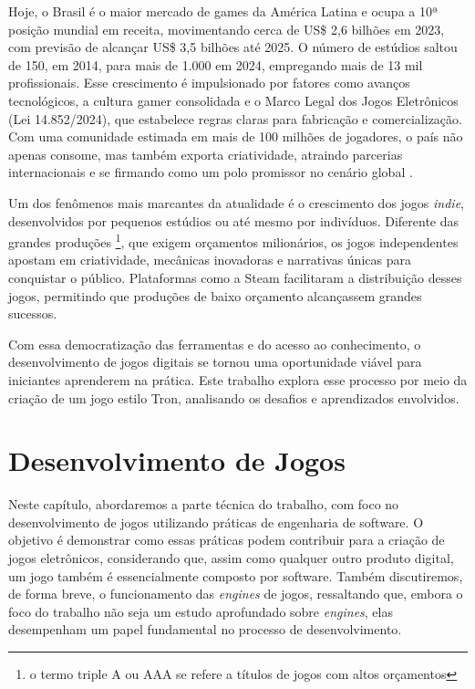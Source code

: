 Hoje, o Brasil é o maior mercado de games da América Latina e ocupa a 10ª posição mundial em receita, movimentando cerca de US\$ 2,6 bilhões em 2023, com previsão de alcançar US\$ 3,5 bilhões até 2025. O número de estúdios saltou de 150, em 2014, para mais de 1.000 em 2024, empregando mais de 13 mil profissionais. Esse crescimento é impulsionado por fatores como avanços tecnológicos, a cultura gamer consolidada e o Marco Legal dos Jogos Eletrônicos (Lei 14.852/2024), que estabelece regras claras para fabricação e comercialização. Com uma comunidade estimada em mais de 100 milhões de jogadores, o país não apenas consome, mas também exporta criatividade, atraindo parcerias internacionais e se firmando como um polo promissor no cenário global \cite{avell2025}.

Um dos fenômenos mais marcantes da atualidade é o crescimento dos jogos \textit{indie}, desenvolvidos por pequenos estúdios ou até mesmo por indivíduos. Diferente das grandes produções  \footnote{o termo triple A ou AAA se refere a títulos de jogos com altos orçamentos}, que exigem orçamentos milionários, os jogos independentes apostam em criatividade, mecânicas inovadoras e narrativas únicas para conquistar o público. Plataformas como a Steam facilitaram a distribuição desses jogos, permitindo que produções de baixo orçamento alcançassem grandes sucessos.

Com essa democratização das ferramentas e do acesso ao conhecimento, o desenvolvimento de jogos digitais se tornou uma oportunidade viável para iniciantes aprenderem na prática. Este trabalho explora esse processo por meio da criação de um jogo estilo Tron, analisando os desafios e aprendizados envolvidos.

\section{Desenvolvimento de Jogos}

Neste capítulo, abordaremos a parte técnica do trabalho, com foco no desenvolvimento de jogos utilizando práticas de engenharia de software. O objetivo é demonstrar como essas práticas podem contribuir para a criação de jogos eletrônicos, considerando que, assim como qualquer outro produto digital, um jogo também é essencialmente composto por software. Também discutiremos, de forma breve, o funcionamento das \textit{engines} de jogos, ressaltando que, embora o foco do trabalho não seja um estudo aprofundado sobre \textit{engines}, elas desempenham um papel fundamental no processo de desenvolvimento.

